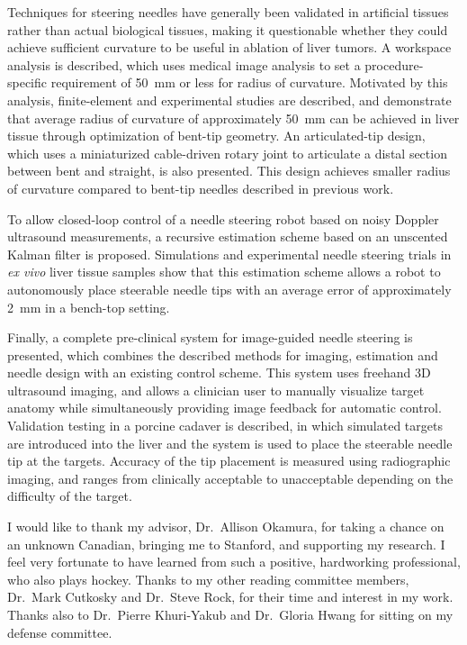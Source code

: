 \documentclass[12pt,twoside]{report}
\begin{document}
Techniques for steering needles have generally been validated in artificial tissues rather than actual biological tissues, making it questionable whether they could achieve sufficient curvature to be useful in ablation of liver tumors. A workspace analysis is described, which uses medical image analysis to set a procedure-specific requirement of 50~mm or less for radius of curvature. Motivated by this analysis, finite-element and experimental studies are described, and demonstrate that average radius of curvature of approximately 50~mm can be achieved in liver tissue through optimization of bent-tip geometry. An articulated-tip design, which uses a miniaturized cable-driven rotary joint to articulate a distal section between bent and straight, is also presented. This design achieves smaller radius of curvature compared to bent-tip needles described in previous work.

To allow closed-loop control of a needle steering robot based on noisy Doppler ultrasound measurements, a recursive estimation scheme based on an unscented Kalman filter is proposed. Simulations and experimental needle steering trials in \textit{ex vivo} liver tissue samples show that this estimation scheme allows a robot to autonomously place steerable needle tips with an average error of approximately 2~mm in a bench-top setting.

Finally, a complete pre-clinical system for image-guided needle steering is presented, which combines the described methods for imaging, estimation and needle design with an existing control scheme. This system uses freehand 3D ultrasound imaging, and allows a clinician user to manually visualize target anatomy while simultaneously providing image feedback for automatic control. Validation testing in a porcine cadaver is described, in which simulated targets are introduced into the liver and the system is used to place the steerable needle tip at the targets. Accuracy of the tip placement is measured using radiographic imaging, and ranges from clinically acceptable to unacceptable depending on the difficulty of the target. 


I would like to thank my advisor, Dr.\ Allison Okamura, for taking a chance on an unknown Canadian, bringing me to Stanford, and supporting my research. I feel very fortunate to have learned from such a positive, hardworking professional, who also plays hockey. Thanks to my other reading committee members, Dr.\ Mark Cutkosky and Dr.\ Steve Rock, for their time and interest in my work. Thanks also to Dr.\ Pierre Khuri-Yakub and Dr.\ Gloria Hwang for sitting on my defense committee. 
\end{document}
